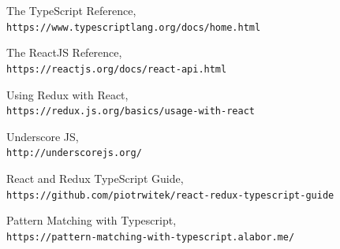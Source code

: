 \documentclass[rel_mlp]{iiufrgs}
\begin{document}


\begin{thebibliography}{9}
The TypeScript Reference,
\\\texttt{https://www.typescriptlang.org/docs/home.html}

The ReactJS Reference,
\\\texttt{https://reactjs.org/docs/react-api.html}


Using Redux with React,
\\\texttt{https://redux.js.org/basics/usage-with-react}

Underscore JS,
\\\texttt{http://underscorejs.org/}

React and Redux TypeScript Guide,
\\\texttt{https://github.com/piotrwitek/react-redux-typescript-guide}

Pattern Matching with Typescript,
\\\texttt{https://pattern-matching-with-typescript.alabor.me/}



\end{thebibliography}
\end{document}
